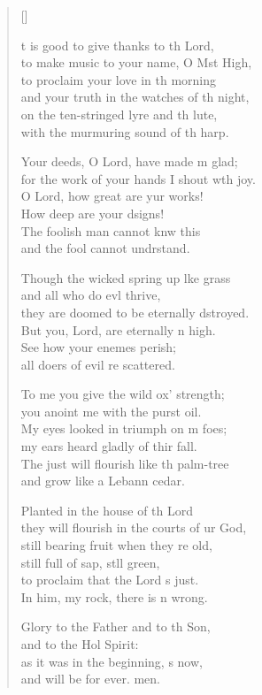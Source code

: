 \settowidth{\versewidth}{for the work of your hands I shout with joy.}
\begin{verse}[\versewidth]
  \begin{patverse}
t is good to give thanks to th Lord,\Med\\
    to make music to your name, O Mst High,\\
to proclaim your love in th morning\Med\\
    and your truth in the watches of th night,\\
on the ten-stringed lyre and th lute,\Med\\
    with the murmuring sound of th harp.

Your deeds, O Lord, have made m glad;\Med\\
    for the work of your hands I shout w\pointup{\i}th joy.\\
O Lord, how great are yur works!\Med\\
    How deep are your dsigns!\\
The foolish man cannot knw this\Med\\
    and the fool cannot undrstand.

Though the wicked spring up l\pointup{\i}ke grass\Med\\
    and all who do ev\pointup{\i}l thrive,\\
they are doomed to be eternally dstroyed.\Med\\
    But you, Lord, are eternally n high.\\
See how your enem\pointup{\i}es perish;\Med\\
    all doers of evil re scattered.

To me you give the wild ox’ strength;\Med\\
    you anoint me with the purst oil.\\
My eyes looked in triumph on m foes;\Med\\
    my ears heard gladly of thir fall.\\
The just will flourish like th palm-tree\Med\\
    and grow like a Lebann cedar.

Planted in the house of th Lord\Med\\
    they will flourish in the courts of ur God,\\
still bearing fruit when they re old,\Med\\
    still full of sap, st\pointup{\i}ll green,\\
to proclaim that the Lord \pointup{\i}s just.\Med\\
    In him, my rock, there is n wrong.

Glory to the Father and to th Son,\Med\\
    and to the Hol Spirit:\\
as it was in the beginning, \pointup{\i}s now,\Med\\
    and will be for ever. men.
  \end{patverse}
  \end{verse}
